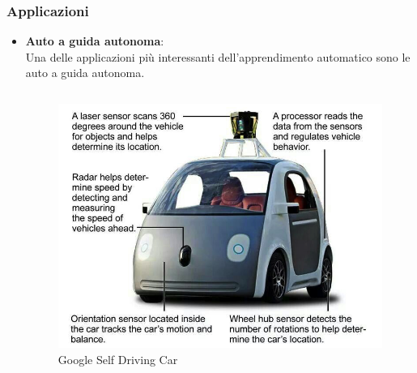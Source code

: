 \begin{frame}
	
	\frametitle{Applicazioni}
		\begin{itemize}
			\item \textbf{Auto a guida autonoma}:\\
				Una delle applicazioni più interessanti dell'apprendimento automatico sono le auto a guida autonoma.\\
				
				\begin{columns}
							
					\begin{figure}[!htbp]
						\centering
						\includegraphics[angle=0,width=\linewidth]{images/intro/self_driving_car_google.jpg}
						\caption{Google Self Driving Car}
					\end{figure}
								

\end{columns}
\end{itemize}
\end{frame}
